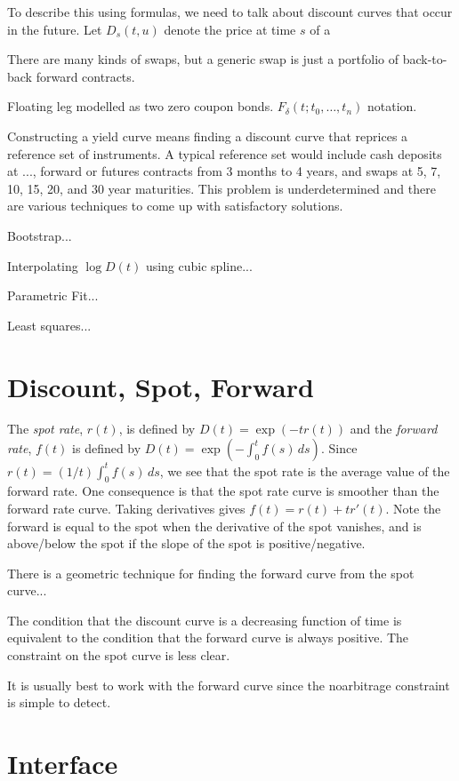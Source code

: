 \documentclass[12pt]{amsart}
\begin{document}
To describe this using formulas, we need to talk about discount
curves that occur in the future. Let $D_s(t, u)$ denote the
price at time $s$ of a 

There are many kinds of swaps, but a generic swap is just a 
portfolio of back-to-back forward contracts.

Floating leg modelled as two zero coupon bonds.
$F_\delta(t; t_0,\dots,t_n)$ notation.

Constructing a yield curve means finding a discount curve that
reprices a reference set of instruments. A typical reference set would
include cash deposits at ..., forward or futures contracts from 3 months
to 4 years, and swaps at 5, 7, 10, 15, 20, and 30 year maturities.
This problem is underdetermined and there are various techniques to come
up with satisfactory solutions.

Bootstrap...

Interpolating $\log D(t)$ using cubic spline...

Parametric Fit...

Least squares...

\section{Discount, Spot, Forward}

The {\em spot rate}, $r(t)$, is defined by $D(t) = \exp(-tr(t))$ and
the {\em forward rate}, $f(t)$ is defined by $D(t) = \exp(-\int_0^t
f(s)\,ds)$. Since $r(t) = (1/t)\int_0^t f(s)\,ds$, we see that the
spot rate is the average value of the forward rate. One consequence
is that the spot rate curve is smoother than the forward rate curve.
Taking derivatives gives $f(t) = r(t) + tr'(t)$. Note the forward is
equal to the spot when the derivative of the spot vanishes, and
is above/below the spot if the slope of the spot is positive/negative.

There is a geometric technique for finding the forward curve from the
spot curve...

The condition that the discount curve is a decreasing function of
time is equivalent to the condition that the forward curve is
always positive. The constraint on the spot curve is less clear.

It is usually best to work with the forward curve since the noarbitrage
constraint is simple to detect.

\section{Interface}
\end{document}

